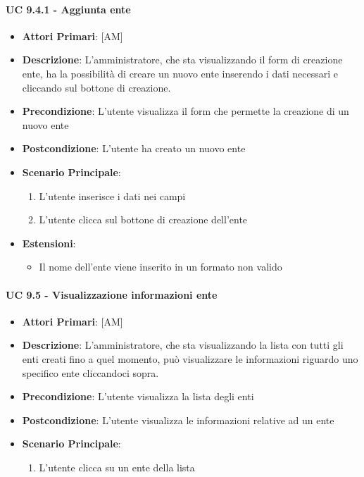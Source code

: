 			\paragraph{UC 9.4.1 - Aggiunta ente}
			\begin{itemize}
				\item \textbf{Attori Primari}: [AM]
				\item \textbf{Descrizione}: L'amministratore, che sta visualizzando il form di creazione ente, ha la possibilità di creare un nuovo ente inserendo i dati necessari e cliccando sul bottone di creazione.
				\item \textbf{Precondizione}: L'utente visualizza il form che permette la creazione di un nuovo ente
				\item \textbf{Postcondizione}: L'utente ha creato un nuovo ente
				\item \textbf{Scenario Principale}:
				\begin{enumerate}
					\item{L'utente inserisce i dati nei campi}
					\item{L'utente clicca sul bottone di creazione dell'ente}
				\end{enumerate}	
				\item \textbf{Estensioni}:
					\begin{itemize}
						\item Il nome dell'ente viene inserito in un formato non valido
					\end{itemize}
			\end{itemize}		

			\paragraph{UC 9.5 - Visualizzazione informazioni ente}
			\begin{itemize}
				\item \textbf{Attori Primari}: [AM]
				\item \textbf{Descrizione}: L'amministratore, che sta visualizzando la lista con tutti gli enti creati fino a quel momento, può visualizzare le informazioni riguardo uno specifico ente cliccandoci sopra. 
				\item \textbf{Precondizione}: L'utente visualizza la lista degli enti
				\item \textbf{Postcondizione}: L'utente visualizza le informazioni relative ad un ente
				\item \textbf{Scenario Principale}:
				\begin{enumerate}
					\item{L'utente clicca su un ente della lista}
				\end{enumerate}
			\end{itemize}	

